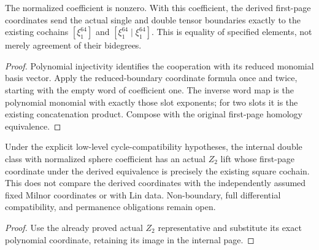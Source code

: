 \begin{proposition}
  \label{prop:h6-exact-polynomial-representatives}
  \leanok
  The normalized coefficient is nonzero. With this coefficient, the
  derived first-page coordinates send the actual single and double tensor
  boundaries exactly to the existing cochains $[\xi_1^{64}]$ and
  $[\xi_1^{64}\mid\xi_1^{64}]$. This is equality of specified elements,
  not merely agreement of their bidegrees.
\end{proposition}
\begin{proof}
  Polynomial injectivity identifies the cooperation with its reduced
  monomial basis vector. Apply the reduced-boundary coordinate formula
  once and twice, starting with the empty word of coefficient one. The
  inverse word map is the polynomial monomial with exactly those slot
  exponents; for two slots it is the existing concatenation product.
  Compose with the original first-page homology equivalence.
  \leanok
\end{proof}

\begin{proposition}
  \label{prop:h6-internal-square-polynomial-provenance}
  \leanok
  Under the explicit low-level cycle-compatibility hypotheses, the internal
  double class with normalized sphere coefficient has an actual $Z_2$ lift
  whose first-page coordinate under the derived equivalence is precisely
  the existing square cochain. This does not compare the derived coordinates
  with the independently assumed fixed Milnor coordinates or with Lin data.
  Non-boundary, full differential compatibility, and permanence obligations
  remain open.
\end{proposition}
\begin{proof}
  Use the already proved actual $Z_2$ representative and substitute its
  exact polynomial coordinate, retaining its image in the internal page.
  \leanok
\end{proof}

